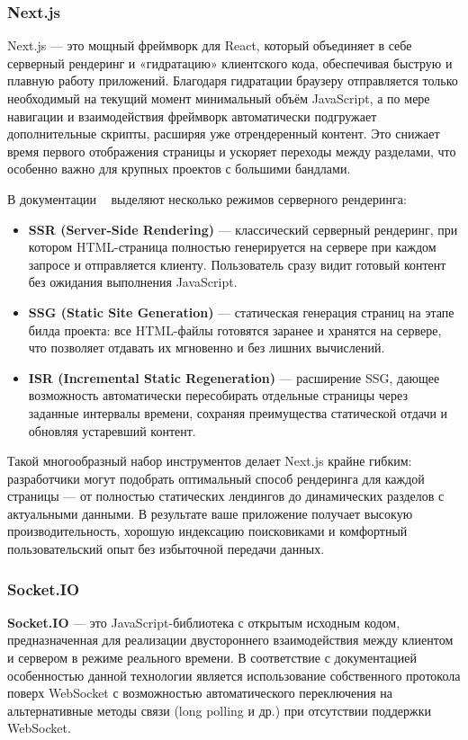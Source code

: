 \subsubsection*{Next.js}

Next.js --- это мощный фреймворк для React, который объединяет в себе серверный рендеринг и «гидратацию» клиентского кода, обеспечивая быструю и плавную работу приложений. Благодаря гидратации браузеру отправляется только необходимый на текущий момент минимальный объём JavaScript, а по мере навигации и взаимодействия фреймворк автоматически подгружает дополнительные скрипты, расширяя уже отрендеренный контент. Это снижает время первого отображения страницы и ускоряет переходы между разделами, что особенно важно для крупных проектов с большими бандлами.

В документации ~\cite{3} выделяют несколько режимов серверного рендеринга:
\begin{itemize}
  \item \textbf{SSR (Server-Side Rendering)} --- классический серверный рендеринг, при котором HTML-страница полностью генерируется на сервере при каждом запросе и отправляется клиенту. Пользователь сразу видит готовый контент без ожидания выполнения JavaScript.
  \item \textbf{SSG (Static Site Generation)} --- статическая генерация страниц на этапе билда проекта: все HTML-файлы готовятся заранее и хранятся на сервере, что позволяет отдавать их мгновенно и без лишних вычислений.
  \item \textbf{ISR (Incremental Static Regeneration)} --- расширение SSG, дающее возможность автоматически пересобирать отдельные страницы через заданные интервалы времени, сохраняя преимущества статической отдачи и обновляя устаревший контент.
\end{itemize}

Такой многообразный набор инструментов делает Next.js крайне гибким: разработчики могут подобрать оптимальный способ рендеринга для каждой страницы --- от полностью статических лендингов до динамических разделов с актуальными данными. В результате ваше приложение получает высокую производительность, хорошую индексацию поисковиками и комфортный пользовательский опыт без избыточной передачи данных.

\subsubsection*{Socket.IO}

\textbf{Socket.IO} --- это JavaScript-библиотека с открытым исходным кодом, предназначенная для реализации двустороннего взаимодействия между клиентом и сервером в режиме реального времени. В соответствие с документацией ~\cite{4} особенностью данной технологии является использование собственного протокола поверх WebSocket с возможностью автоматического переключения на альтернативные методы связи (long polling и др.) при отсутствии поддержки WebSocket.

